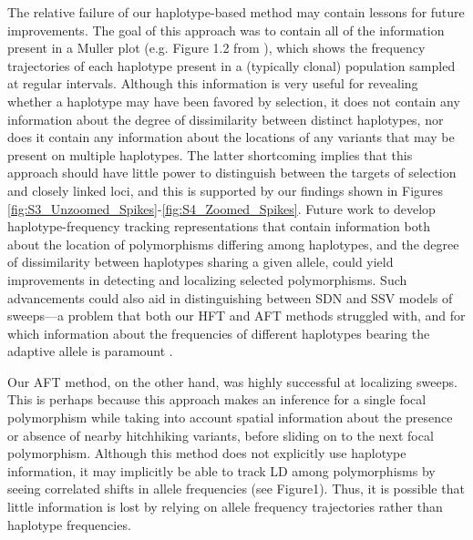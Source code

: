 The relative failure of our haplotype-based method may contain lessons for future improvements. The goal of this approach was to contain all of the information present in a Muller plot (e.g. Figure 1.2 from \cite{herronParallelEvolutionaryDynamics2013}), which shows the frequency trajectories of each haplotype present in a (typically clonal) population sampled at regular intervals. Although this information is very useful for revealing whether a haplotype may have been favored by selection, it does not contain any information about the degree of dissimilarity between distinct haplotypes, nor does it contain any information about the locations of any variants that may be present on multiple haplotypes. The latter shortcoming implies that this approach should have little power to distinguish between the targets of selection and closely linked loci, and this is supported by our findings shown in Figures \ref{fig:S3_Unzoomed_Spikes}-\ref{fig:S4_Zoomed_Spikes}. Future work to develop haplotype-frequency tracking representations that contain information both about the location of polymorphisms differing among haplotypes, and the degree of dissimilarity between haplotypes sharing a given allele, could yield improvements in detecting and localizing selected polymorphisms. Such advancements could also aid in distinguishing between SDN and SSV models of sweeps—a problem that both our HFT and AFT methods struggled with, and for which information about the frequencies of different haplotypes bearing the adaptive allele is paramount \cite{garudRecentSelectiveSweeps2015}.

Our AFT method, on the other hand, was highly successful at localizing sweeps. This is perhaps because this approach makes an inference for a single focal polymorphism while taking into account spatial information about the presence or absence of nearby hitchhiking variants, before sliding on to the next focal polymorphism. Although this method does not explicitly use haplotype information, it may implicitly be able to track LD among polymorphisms by seeing correlated shifts in allele frequencies (see Figure1). Thus, it is possible that little information is lost by relying on allele frequency trajectories rather than haplotype frequencies.

